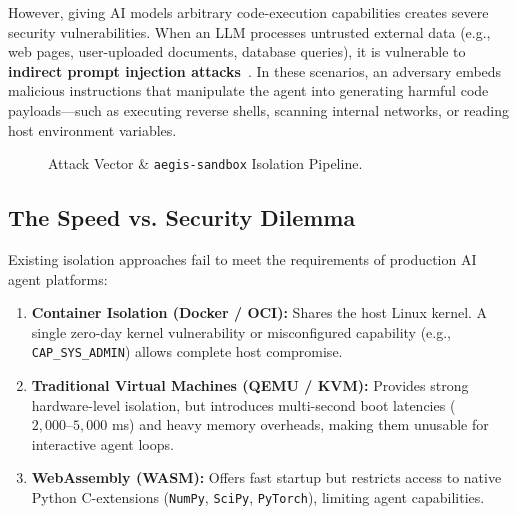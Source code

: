 \documentclass[11pt,a4paper]{article}
\begin{document}
However, giving AI models arbitrary code-execution capabilities creates severe security vulnerabilities. When an LLM processes untrusted external data (e.g., web pages, user-uploaded documents, database queries), it is vulnerable to \textbf{indirect prompt injection attacks}~\cite{prompt_injection}. In these scenarios, an adversary embeds malicious instructions that manipulate the agent into generating harmful code payloads—such as executing reverse shells, scanning internal networks, or reading host environment variables.

\begin{figure}[h!]
\centering
{}
\caption{Attack Vector \& \texttt{aegis-sandbox} Isolation Pipeline.}
\label{fig:attack_pipeline}
\end{figure}

\subsection{The Speed vs. Security Dilemma}
Existing isolation approaches fail to meet the requirements of production AI agent platforms:
\begin{enumerate}
    \item \textbf{Container Isolation (Docker / OCI):} Shares the host Linux kernel. A single zero-day kernel vulnerability or misconfigured capability (e.g., \texttt{CAP\_SYS\_ADMIN}) allows complete host compromise.
    \item \textbf{Traditional Virtual Machines (QEMU / KVM):} Provides strong hardware-level isolation, but introduces multi-second boot latencies ($2,000\text{--}5,000$ ms) and heavy memory overheads, making them unusable for interactive agent loops.
    \item \textbf{WebAssembly (WASM):} Offers fast startup but restricts access to native Python C-extensions (\texttt{NumPy}, \texttt{SciPy}, \texttt{PyTorch}), limiting agent capabilities.
\end{enumerate}
\end{document}
